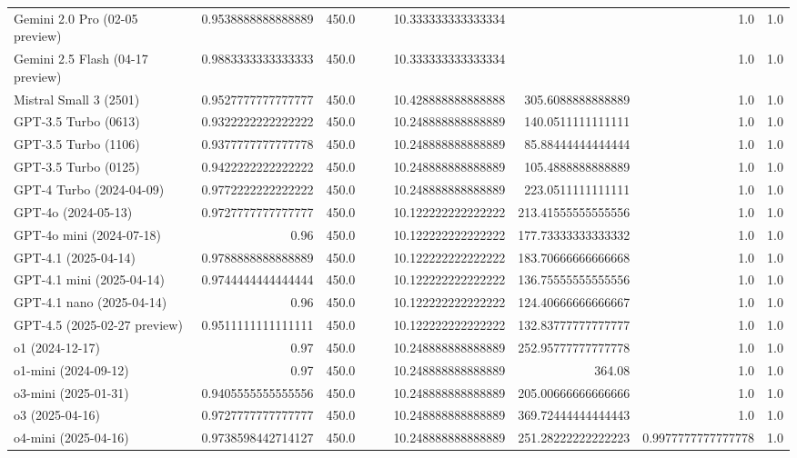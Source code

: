\begin{table}[htp]
{\begin{tabular}{lrrrrrrrr}
Gemini 2.0 Pro (02-05 preview) & 0.9538888888888889 & 450.0 &  &  & 10.333333333333334 &  & 1.0 & 1.0 \\
Gemini 2.5 Flash (04-17 preview) & 0.9883333333333333 & 450.0 &  &  & 10.333333333333334 &  & 1.0 & 1.0 \\
Mistral Small 3 (2501) & 0.9527777777777777 & 450.0 &  &  & 10.428888888888888 & 305.6088888888889 & 1.0 & 1.0 \\
GPT-3.5 Turbo (0613) & 0.9322222222222222 & 450.0 &  &  & 10.248888888888889 & 140.0511111111111 & 1.0 & 1.0 \\
GPT-3.5 Turbo (1106) & 0.9377777777777778 & 450.0 &  &  & 10.248888888888889 & 85.88444444444444 & 1.0 & 1.0 \\
GPT-3.5 Turbo (0125) & 0.9422222222222222 & 450.0 &  &  & 10.248888888888889 & 105.4888888888889 & 1.0 & 1.0 \\
GPT-4 Turbo (2024-04-09) & 0.9772222222222222 & 450.0 &  &  & 10.248888888888889 & 223.0511111111111 & 1.0 & 1.0 \\
GPT-4o (2024-05-13) & 0.9727777777777777 & 450.0 &  &  & 10.122222222222222 & 213.41555555555556 & 1.0 & 1.0 \\
GPT-4o mini (2024-07-18) & 0.96 & 450.0 &  &  & 10.122222222222222 & 177.73333333333332 & 1.0 & 1.0 \\
GPT-4.1 (2025-04-14) & 0.9788888888888889 & 450.0 &  &  & 10.122222222222222 & 183.70666666666668 & 1.0 & 1.0 \\
GPT-4.1 mini (2025-04-14) & 0.9744444444444444 & 450.0 &  &  & 10.122222222222222 & 136.75555555555556 & 1.0 & 1.0 \\
GPT-4.1 nano (2025-04-14) & 0.96 & 450.0 &  &  & 10.122222222222222 & 124.40666666666667 & 1.0 & 1.0 \\
GPT-4.5 (2025-02-27 preview) & 0.9511111111111111 & 450.0 &  &  & 10.122222222222222 & 132.83777777777777 & 1.0 & 1.0 \\
o1 (2024-12-17) & 0.97 & 450.0 &  &  & 10.248888888888889 & 252.95777777777778 & 1.0 & 1.0 \\
o1-mini (2024-09-12) & 0.97 & 450.0 &  &  & 10.248888888888889 & 364.08 & 1.0 & 1.0 \\
o3-mini (2025-01-31) & 0.9405555555555556 & 450.0 &  &  & 10.248888888888889 & 205.00666666666666 & 1.0 & 1.0 \\
o3 (2025-04-16) & 0.9727777777777777 & 450.0 &  &  & 10.248888888888889 & 369.72444444444443 & 1.0 & 1.0 \\
o4-mini (2025-04-16) & 0.9738598442714127 & 450.0 &  &  & 10.248888888888889 & 251.28222222222223 & 0.9977777777777778 & 1.0 \\

\end{tabular}}
\end{table}
